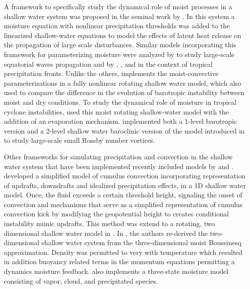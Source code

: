 A framework to specifically study the dynamical role of moist processes in a shallow water system
was proposed in the seminal work by \cite{gill1982studies}. In this system
 a moisture equation with nonlinear precipitation thresholds was added to the 
linearized shallow-water equations to model the effects of latent heat release on the 
propagation of large scale disturbances. Similar models incorporating this framework for 
parameterizing moisture were analyzed by \cite{goswami1991modification} to study
large-scale equatorial waves propagation and by \cite{frierson2004large},
\cite{stechmann2006structure}, and \cite{bouchut2009fronts} in the context of tropical precipitation 
fronts. Unlike the others, \cite{bouchut2009fronts} implements the moist-convective 
parameterizations in a fully nonlinear rotating shallow water model,
which \cite{lambaerts2011moist} also used to compare the difference in the evolution 
of barotropic instability between moist and dry conditions. To study the
dynamical role of moisture in tropical cyclone instabilities, \cite{lahaye2016understanding} 
used this moist rotating shallow-water model with the addition of an evaporation 
mechanism. \cite{rostami2017influence} implemented both a 1-level barotropic 
version and a 2-level shallow water baroclinic version of the model introduced in 
\cite{lambaerts2011moist} to study large-scale small Rossby number vortices.

Other frameworks for simulating precipitation and convection in the shallow water
system that have been implemented recently included models by 
\cite{wursch2014simple} and \cite{zerroukat2015moist}.
\cite{wursch2014simple} developed a simplified model of cumulus convection 
incorporating representation of updrafts, downdrafts and idealized precipitation 
effects, in a 1D shallow water model. 
Once, the fluid exceeds a certain threshold height, signaling the 
onset of convection and mechanisms that serve as a simplified representation 
of cumulus convection kick by modifying the geopotential height to creates 
conditional instability mimic updrafts. 
This method was extend to a rotating, two dimensional shallow 
water model in \cite{kent2017dynamics}.
In \cite{zerroukat2015moist}, the authors re-derived the two-dimensional
shallow water system from the three-dimensional moist Boussinesq 
approximation. Density was permitted to very with temperature which
resulted in addition buoyancy related terms in the momentum equations
permitting a dynamics moisture feedback. \cite{zerroukat2015moist} also 
implements a three-state moisture model consisting of vapor, cloud, and 
precipitated species.

